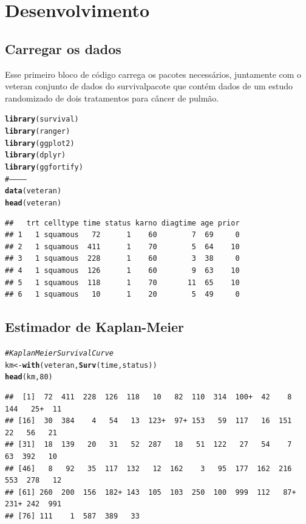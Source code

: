 \documentclass[a4paper, oneside]{book}\usepackage[]{graphicx}\usepackage[]{color}
\makeatletter
\newcommand{\hlnum}[1]{\textcolor[rgb]{0.686,0.059,0.569}{#1}}%
\newcommand{\hlcom}[1]{\textcolor[rgb]{0.678,0.584,0.686}{\textit{#1}}}%
\newcommand{\hlstd}[1]{\textcolor[rgb]{0.345,0.345,0.345}{#1}}%
\newcommand{\hlkwb}[1]{\textcolor[rgb]{0.69,0.353,0.396}{#1}}%
\newcommand{\hlkwd}[1]{\textcolor[rgb]{0.737,0.353,0.396}{\textbf{#1}}}%
\newenvironment{kframe}{%
 \def\at@end@of@kframe{}%
 \ifinner\ifhmode%
  \def\at@end@of@kframe{\end{minipage}}%
  \begin{minipage}{\columnwidth}%
 \fi\fi%
 \def\FrameCommand##1{\hskip\@totalleftmargin \hskip-\fboxsep
 \colorbox{shadecolor}{##1}\hskip-\fboxsep
     \hskip-\linewidth \hskip-\@totalleftmargin \hskip\columnwidth}%
 \MakeFramed {\advance\hsize-\width
   \@totalleftmargin\z@ \linewidth\hsize
   \@setminipage}}%
 {\par\unskip\endMakeFramed%
 \at@end@of@kframe}
\newenvironment{knitrout}{}{} %
\makeatother
\begin{document}
  
  
  \chapter{Desenvolvimento}
  
    \section{Carregar os dados}
    
Esse primeiro bloco de código carrega os pacotes necessários, juntamente com o veteran conjunto de dados do survivalpacote que contém dados de um estudo randomizado de dois tratamentos para câncer de pulmão.

\begin{knitrout}
\color{fgcolor}\begin{kframe}
\begin{alltt}
\hlkwd{library}\hlstd{(survival)}
\hlkwd{library}\hlstd{(ranger)}
\hlkwd{library}\hlstd{(ggplot2)}
\hlkwd{library}\hlstd{(dplyr)}
\hlkwd{library}\hlstd{(ggfortify)}
\hlcom{#------------}
\hlkwd{data}\hlstd{(veteran)}
\hlkwd{head}\hlstd{(veteran)}
\end{alltt}
\begin{verbatim}
##   trt celltype time status karno diagtime age prior
## 1   1 squamous   72      1    60        7  69     0
## 2   1 squamous  411      1    70        5  64    10
## 3   1 squamous  228      1    60        3  38     0
## 4   1 squamous  126      1    60        9  63    10
## 5   1 squamous  118      1    70       11  65    10
## 6   1 squamous   10      1    20        5  49     0
\end{verbatim}
\end{kframe}
\end{knitrout}



    \section{Estimador de Kaplan-Meier}
    
\begin{knitrout}
\color{fgcolor}\begin{kframe}
\begin{alltt}
\hlcom{# Kaplan Meier Survival Curve}
\hlstd{km} \hlkwb{<-} \hlkwd{with}\hlstd{(veteran,} \hlkwd{Surv}\hlstd{(time, status))}
\hlkwd{head}\hlstd{(km,}\hlnum{80}\hlstd{)}
\end{alltt}
\begin{verbatim}
##  [1]  72  411  228  126  118   10   82  110  314  100+  42    8  144   25+  11 
## [16]  30  384    4   54   13  123+  97+ 153   59  117   16  151   22   56   21 
## [31]  18  139   20   31   52  287   18   51  122   27   54    7   63  392   10 
## [46]   8   92   35  117  132   12  162    3   95  177  162  216  553  278   12 
## [61] 260  200  156  182+ 143  105  103  250  100  999  112   87+ 231+ 242  991 
## [76] 111    1  587  389   33
\end{verbatim}
\end{kframe}
\end{knitrout}
\end{document}
